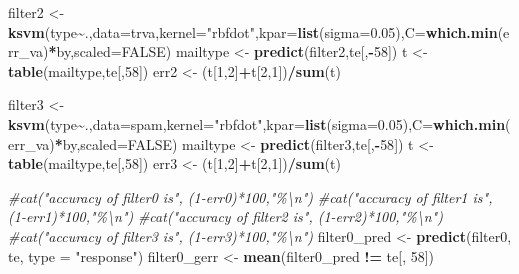 \documentclass[
]{article}
\newenvironment{Shaded}{\begin{snugshade}}{\end{snugshade}}
\newcommand{\AttributeTok}[1]{\textcolor[rgb]{0.13,0.29,0.53}{#1}}
\newcommand{\CommentTok}[1]{\textcolor[rgb]{0.56,0.35,0.01}{\textit{#1}}}
\newcommand{\ConstantTok}[1]{\textcolor[rgb]{0.56,0.35,0.01}{#1}}
\newcommand{\DecValTok}[1]{\textcolor[rgb]{0.00,0.00,0.81}{#1}}
\newcommand{\FloatTok}[1]{\textcolor[rgb]{0.00,0.00,0.81}{#1}}
\newcommand{\FunctionTok}[1]{\textcolor[rgb]{0.13,0.29,0.53}{\textbf{#1}}}
\newcommand{\NormalTok}[1]{#1}
\newcommand{\OtherTok}[1]{\textcolor[rgb]{0.56,0.35,0.01}{#1}}
\newcommand{\SpecialCharTok}[1]{\textcolor[rgb]{0.81,0.36,0.00}{\textbf{#1}}}
\newcommand{\StringTok}[1]{\textcolor[rgb]{0.31,0.60,0.02}{#1}}
\begin{document}
\begin{Shaded}
\begin{Highlighting}[]
\NormalTok{filter2 }\OtherTok{\textless{}{-}} \FunctionTok{ksvm}\NormalTok{(type}\SpecialCharTok{\textasciitilde{}}\NormalTok{.,}\AttributeTok{data=}\NormalTok{trva,}\AttributeTok{kernel=}\StringTok{"rbfdot"}\NormalTok{,}\AttributeTok{kpar=}\FunctionTok{list}\NormalTok{(}\AttributeTok{sigma=}\FloatTok{0.05}\NormalTok{),}\AttributeTok{C=}\FunctionTok{which.min}\NormalTok{(err\_va)}\SpecialCharTok{*}\NormalTok{by,}\AttributeTok{scaled=}\ConstantTok{FALSE}\NormalTok{)}
\NormalTok{mailtype }\OtherTok{\textless{}{-}} \FunctionTok{predict}\NormalTok{(filter2,te[,}\SpecialCharTok{{-}}\DecValTok{58}\NormalTok{])}
\NormalTok{t }\OtherTok{\textless{}{-}} \FunctionTok{table}\NormalTok{(mailtype,te[,}\DecValTok{58}\NormalTok{])}
\NormalTok{err2 }\OtherTok{\textless{}{-}}\NormalTok{ (t[}\DecValTok{1}\NormalTok{,}\DecValTok{2}\NormalTok{]}\SpecialCharTok{+}\NormalTok{t[}\DecValTok{2}\NormalTok{,}\DecValTok{1}\NormalTok{])}\SpecialCharTok{/}\FunctionTok{sum}\NormalTok{(t)}


\NormalTok{filter3 }\OtherTok{\textless{}{-}} \FunctionTok{ksvm}\NormalTok{(type}\SpecialCharTok{\textasciitilde{}}\NormalTok{.,}\AttributeTok{data=}\NormalTok{spam,}\AttributeTok{kernel=}\StringTok{"rbfdot"}\NormalTok{,}\AttributeTok{kpar=}\FunctionTok{list}\NormalTok{(}\AttributeTok{sigma=}\FloatTok{0.05}\NormalTok{),}\AttributeTok{C=}\FunctionTok{which.min}\NormalTok{(err\_va)}\SpecialCharTok{*}\NormalTok{by,}\AttributeTok{scaled=}\ConstantTok{FALSE}\NormalTok{)}
\NormalTok{mailtype }\OtherTok{\textless{}{-}} \FunctionTok{predict}\NormalTok{(filter3,te[,}\SpecialCharTok{{-}}\DecValTok{58}\NormalTok{])}
\NormalTok{t }\OtherTok{\textless{}{-}} \FunctionTok{table}\NormalTok{(mailtype,te[,}\DecValTok{58}\NormalTok{])}
\NormalTok{err3 }\OtherTok{\textless{}{-}}\NormalTok{ (t[}\DecValTok{1}\NormalTok{,}\DecValTok{2}\NormalTok{]}\SpecialCharTok{+}\NormalTok{t[}\DecValTok{2}\NormalTok{,}\DecValTok{1}\NormalTok{])}\SpecialCharTok{/}\FunctionTok{sum}\NormalTok{(t)}

\CommentTok{\#cat("accuracy of filter0 is", (1{-}err0)*100,"\%\textbackslash{}n")}
\CommentTok{\#cat("accuracy of filter1 is", (1{-}err1)*100,"\%\textbackslash{}n")}
\CommentTok{\#cat("accuracy of filter2 is", (1{-}err2)*100,"\%\textbackslash{}n")}
\CommentTok{\#cat("accuracy of filter3 is", (1{-}err3)*100,"\%\textbackslash{}n")}
\NormalTok{filter0\_pred }\OtherTok{\textless{}{-}} \FunctionTok{predict}\NormalTok{(filter0, te, }\AttributeTok{type =} \StringTok{"response"}\NormalTok{)}
\NormalTok{filter0\_gerr }\OtherTok{\textless{}{-}} \FunctionTok{mean}\NormalTok{(filter0\_pred }\SpecialCharTok{!=}\NormalTok{ te[, }\DecValTok{58}\NormalTok{])}


\end{Highlighting}
\end{Shaded}
\end{document}
